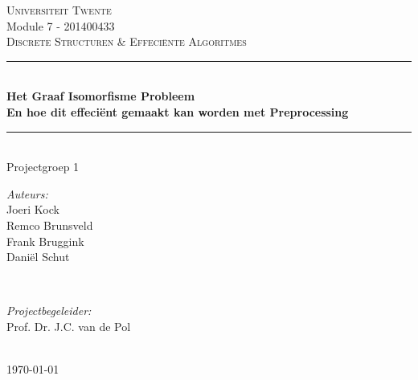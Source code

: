 
\begin{titlepage}

\newcommand{\HRule}{\rule{\linewidth}{0.5mm}}

\center 		%
 

\textsc{\large Universiteit Twente}\\[1.5cm]
Module 7 - 201400433\\
\vspace{5mm}
\textsc{\Large Discrete Structuren \& Effeci\"ente Algoritmes}\\[0.5cm]
\vspace{15mm}


\HRule \\[0.4cm]
{ \huge \bfseries Het Graaf Isomorfisme Probleem}\\[0.4cm]
{ \large \bfseries En hoe dit effeci\"ent gemaakt kan worden met Preprocessing}\\[0.4cm]
\HRule \\[1.5cm]
 

Projectgroep 1\\
\vspace{10mm}
\begin{minipage}{0.4\textwidth}
\begin{flushleft} \large
\emph{Auteurs:}\\
Joeri Kock\\
Remco Brunsveld\\
Frank Bruggink\\
Dani\"el Schut
\end{flushleft}
\end{minipage}
~
\begin{minipage}{0.4\textwidth}
\begin{flushright} \large
\emph{Projectbegeleider:} \\
Prof. Dr. J.C. van de Pol
\end{flushright}
\end{minipage}\\[4cm]


{\large \today}\\[3cm]

\pagebreak 			%

\end{titlepage}